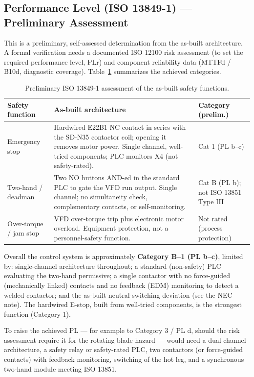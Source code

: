 \documentclass[hidelinks,12pt]{article}
\begin{document}
\subsection{Performance Level (ISO 13849-1) --- Preliminary Assessment}
This is a preliminary, self-assessed determination from the as-built architecture. A formal verification needs a documented ISO 12100 risk assessment (to set the required performance level, PLr) and component reliability data (MTTFd / B10d, diagnostic coverage). Table~\ref{tab:pl} summarizes the achieved categories.

\begin{table}[H]
\centering
\renewcommand{\arraystretch}{1.3}
\caption{Preliminary ISO 13849-1 assessment of the as-built safety functions.}
\label{tab:pl}
\begin{tabularx}{\textwidth}{|p{2.5cm}|X|p{2.3cm}|}
\hline
\rowcolor{PSUgreen!12}\textbf{Safety function} & \textbf{As-built architecture} & \textbf{Category (prelim.)} \\
\hline
Emergency stop & Hardwired E22B1 NC contact in series with the SD-N35 contactor coil; opening it removes motor power. Single channel, well-tried components; PLC monitors X4 (not safety-rated). & Cat 1 (PL b--c) \\ \hline
Two-hand / deadman & Two NO buttons AND-ed in the standard PLC to gate the VFD run output. Single channel; no simultaneity check, complementary contacts, or self-monitoring. & Cat B (PL b); not ISO 13851 Type III \\ \hline
Over-torque / jam stop & VFD over-torque trip plus electronic motor overload. Equipment protection, not a personnel-safety function. & Not rated (process protection) \\
\hline
\end{tabularx}
\end{table}

Overall the control system is approximately \textbf{Category B--1 (PL b--c)}, limited by: single-channel architecture throughout; a standard (non-safety) PLC evaluating the two-hand permissive; a single contactor with no force-guided (mechanically linked) contacts and no feedback (EDM) monitoring to detect a welded contactor; and the as-built neutral-switching deviation (see the NEC note). The hardwired E-stop, built from well-tried components, is the strongest function (Category 1).

To raise the achieved PL --- for example to Category 3 / PL d, should the risk assessment require it for the rotating-blade hazard --- would need a dual-channel architecture, a safety relay or safety-rated PLC, two contactors (or force-guided contacts) with feedback monitoring, switching of the hot leg, and a synchronous two-hand module meeting ISO 13851.
\end{document}
